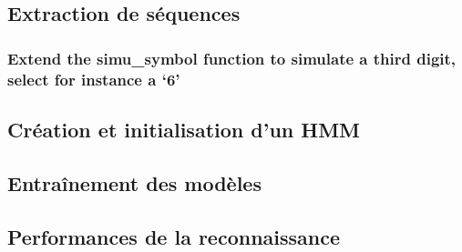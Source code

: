 \subsection{Extraction de séquences}
\subsubsection*{Extend the simu\_symbol function to simulate a third digit, select for instance a ‘6’}
\subsection{Création et initialisation d'un HMM}
\subsection{Entraînement des modèles}
\subsection{Performances de la reconnaissance}
